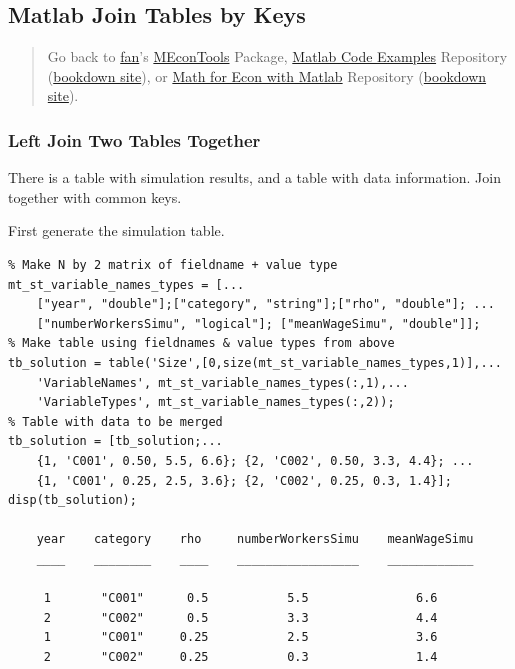 \documentclass[
]{book}
\begin{document}
\hypertarget{matlab-join-tables-by-keys}{%
\subsection{Matlab Join Tables by Keys}\label{matlab-join-tables-by-keys}}

\begin{quote}
Go back to \href{http://fanwangecon.github.io/}{fan}'s \href{https://fanwangecon.github.io/MEconTools/}{MEconTools} Package, \href{https://fanwangecon.github.io/M4Econ/}{Matlab Code Examples} Repository (\href{https://fanwangecon.github.io/M4Econ/bookdown}{bookdown site}), or \href{https://fanwangecon.github.io/Math4Econ/}{Math for Econ with Matlab} Repository (\href{https://fanwangecon.github.io/Math4Econ/bookdown}{bookdown site}).
\end{quote}

\hypertarget{left-join-two-tables-together}{%
\subsubsection{Left Join Two Tables Together}\label{left-join-two-tables-together}}

There is a table with simulation results, and a table with data
information. Join together with common keys.

First generate the simulation table.

\begin{verbatim}
% Make N by 2 matrix of fieldname + value type
mt_st_variable_names_types = [...
    ["year", "double"];["category", "string"];["rho", "double"]; ...
    ["numberWorkersSimu", "logical"]; ["meanWageSimu", "double"]];
% Make table using fieldnames & value types from above
tb_solution = table('Size',[0,size(mt_st_variable_names_types,1)],... 
    'VariableNames', mt_st_variable_names_types(:,1),...
    'VariableTypes', mt_st_variable_names_types(:,2));
% Table with data to be merged
tb_solution = [tb_solution;...
    {1, 'C001', 0.50, 5.5, 6.6}; {2, 'C002', 0.50, 3.3, 4.4}; ...
    {1, 'C001', 0.25, 2.5, 3.6}; {2, 'C002', 0.25, 0.3, 1.4}];
disp(tb_solution);

    year    category    rho     numberWorkersSimu    meanWageSimu
    ____    ________    ____    _________________    ____________

     1       "C001"      0.5           5.5               6.6     
     2       "C002"      0.5           3.3               4.4     
     1       "C001"     0.25           2.5               3.6     
     2       "C002"     0.25           0.3               1.4     
\end{verbatim}
\end{document}
